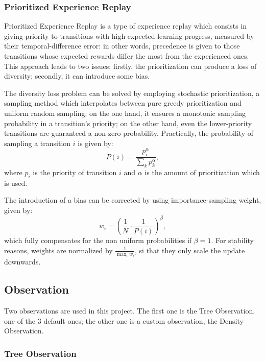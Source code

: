 \documentclass[a4paper, 12pt]{article}
\numberwithin{equation}{section}
\begin{document}
\subsubsection[Prioritized Experience Replay]{Prioritized Experience Replay \cite{prioritized-experience-replay}}
Prioritized Experience Replay is a type of experience replay which consists in giving priority to transitions with high expected learning progress, measured by their temporal-difference error: in other words, precedence is given to those transitions whose expected rewards differ the most from the experienced ones. This approach leads to two issues: firstly, the prioritization can produce a loss of diversity; secondly, it can introduce some bias.

The diversity loss problem can be solved by employing stochastic prioritization, a sampling method which interpolates between pure greedy prioritization and uniform random sampling: on the one hand, it ensures a monotonic sampling probability in a transition's priority; on the other hand, even the lower-priority transitions are guaranteed a non-zero probability. Practically, the probability of sampling a transition $i$ is given by:
\begin{equation}
	P\left(i\right)=\frac{p_i^\alpha}{\sum_kp_k^\alpha},
\end{equation}
where $p_i$ is the priority of transition $i$ and $\alpha$ is the amount of prioritization which is used.

The introduction of a bias can be corrected by using importance-sampling weight, given by:
\begin{equation}
	w_i=\left(\frac{1}{N}\cdot\frac{1}{P\left(i\right)}\right)^\beta,
\end{equation}
which fully compensates for the non uniform probabilities if $\beta=1$. For stability reasons, weights are normalized by $\frac{1}{\max_iw_i}$, si that they only scale the update downwards.


\subsection{Observation}
Two observations are used in this project. The first one is the Tree Observation, one of the 3 default ones; the other one is a custom observation, the Density Observation.


\subsubsection[Tree Observation]{Tree Observation \cite{observations}}\label{sec:tree-observation}
\end{document}
